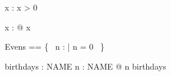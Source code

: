 \documentclass[a4paper,10pt,fleqn]{article}
\begin{document}
\begin{axdef}
x : \nat
\where
x > 0
\end{axdef}

\begin{zed}
\forall x : \nat @ x 
\end{zed}

\begin{zed}
Evens == \{~ n : \nat | n  = 0 ~\}
\end{zed}

\begin{zed}
[NAME]
\end{zed}

\begin{axdef}
birthdays : \power NAME
\where
\exists n : NAME @ n \in birthdays
\end{axdef}
\end{document}
